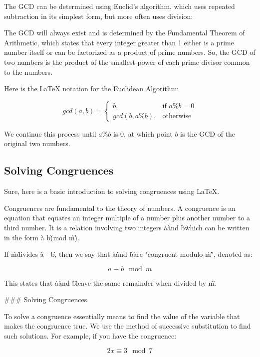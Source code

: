 The GCD can be determined using Euclid's algorithm, which uses repeated subtraction in its simplest form, but more often uses division:

The GCD will always exist and is determined by the Fundamental Theorem of Arithmetic, which states that every integer greater than 1 either is a prime number itself or can be factorized as a product of prime numbers. So, the GCD of two numbers is the product of the smallest power of each prime divisor common to the numbers. 

Here is the LaTeX notation for the Euclidean Algorithm:

\[
\begin{equation}
gcd(a, b) = 
\begin{cases} 
b, & \text{if } a \% b = 0 \\
gcd(b, a \% b), & \text{otherwise}
\end{cases}
\end{equation}
\]

We continue this process until $a\%b$ is 0, at which point $b$ is the GCD of the original two numbers.

\subsection{Solving Congruences}
Sure, here is a basic introduction to solving congruences using LaTeX.

Congruences are fundamental to the theory of numbers. A congruence is an equation that equates an integer multiple of a number plus another number to a third number. It is a relation involving two integers \`a\` and \`b\` which can be written in the form \`a \equiv b\`(mod \`m\`).

If \`m\` divides \`a - b\`, then we say that \`a\` and \`b\` are "congruent modulo \`m\`", denoted as:

\begin{equation}
a \equiv b \mod{m}
\end{equation}

This states that \`a\` and \`b\` leave the same remainder when divided by \`m\`.

### Solving Congruences

To solve a congruence essentially means to find the value of the variable that makes the congruence true. We use the method of successive substitution to find such solutions. For example, if you have the congruence:

\begin{equation}
2x \equiv 3 \mod{7}
\end{equation}

